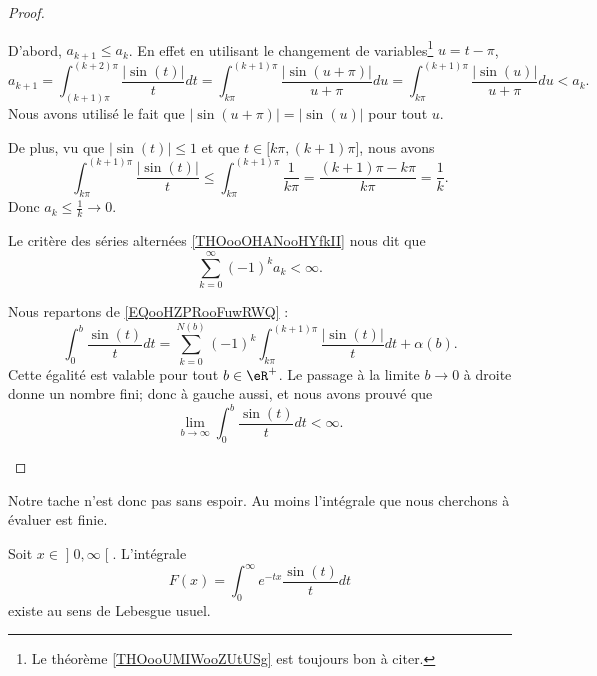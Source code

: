 \begin{proof}
\begin{subproof}
		D'abord, \( a_{k+1}\leq a_k\). En effet en utilisant le changement de variables\footnote{Le théorème \ref{THOooUMIWooZUtUSg} est toujours bon à citer.} \( u=t-\pi\),
		\begin{equation}
			a_{k+1}=\int_{(k+1)\pi}^{(k+2)\pi}\frac{ | \sin(t) | }{ t }dt=\int_{k\pi}^{(k+1)\pi}\frac{ | \sin(u+\pi) | }{ u+\pi }du=\int_{k\pi}^{(k+1)\pi}\frac{ | \sin(u) | }{ u+\pi }du<a_k.
		\end{equation}
		Nous avons utilisé le fait que \( | \sin(u+\pi) |=| \sin(u) |\) pour tout \( u\).

		De plus, vu que \( | \sin(t) |\leq 1\) et que \( t\in\mathopen[ k\pi , (k+1)\pi \mathclose]\), nous avons
		\begin{equation}
			\int_{k\pi}^{(k+1)\pi}\frac{ | \sin(t) | }{ t }\leq \int_{k\pi}^{(k+1)\pi}\frac{1}{ k\pi }=\frac{ (k+1)\pi-k\pi }{ k\pi }=\frac{1}{ k }.
		\end{equation}
		Donc \( a_k\leq\frac{1}{ k }\to 0\).

		Le critère des séries alternées \ref{THOooOHANooHYfkII} nous dit que
		\begin{equation}
			\sum_{k=0}^{\infty}(-1)^ka_k<\infty.
		\end{equation}

		\spitem[Conclusion]
		Nous repartons de \eqref{EQooHZPRooFuwRWQ} :
		\begin{equation}
			\int_0^b\frac{ \sin(t) }{ t }dt=\sum_{k=0}^{N(b)}(-1)^k\int_{k\pi}^{(k+1)\pi}\frac{ | \sin(t) | }{ t }dt+\alpha(b).
		\end{equation}
		Cette égalité est valable pour tout \( b\in \eR^+\). Le passage à la limite \( b\to 0\) à droite donne un nombre fini; donc à gauche aussi, et nous avons prouvé que
		\begin{equation}
			\lim_{b\to\infty} \int_0^b\frac{ \sin(t) }{ t }dt<\infty.
		\end{equation}
	\end{subproof}
\end{proof}
Notre tache n'est donc pas sans espoir. Au moins l'intégrale que nous cherchons à évaluer est finie.

\begin{lemma}       \label{LEMooARPIooDPSGwR}
	Soit \( x\in \mathopen] 0 , \infty \mathclose[\). L'intégrale
	\begin{equation}
		F(x)=\int_0^{\infty} e^{-tx}\frac{ \sin(t) }{ t }dt
	\end{equation}
	existe au sens de Lebesgue usuel.
\end{lemma}

